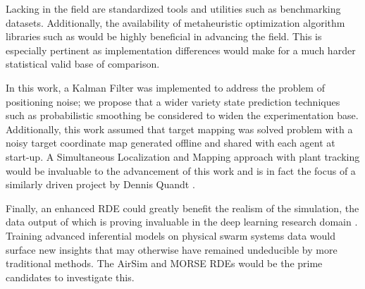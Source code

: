 \documentclass{report}
\begin{document}
Lacking in the field are standardized tools and utilities such as benchmarking datasets. Additionally, the availability of metaheuristic optimization algorithm libraries such as \cite{James2018} would be highly beneficial in advancing the field. This is especially pertinent as implementation differences would make for a much harder statistical valid base of comparison.

In this work, a Kalman Filter was implemented to address the problem of positioning noise; we propose that a wider variety state prediction techniques such as probabilistic smoothing be considered to widen the experimentation base. Additionally, this work assumed that target mapping was solved problem with a noisy target coordinate map generated offline and shared with each agent at start-up. A Simultaneous Localization and Mapping approach with plant tracking would be invaluable to the advancement of this work and is in fact the focus of a similarly driven project by Dennis Quandt \cite{}.

Finally, an enhanced RDE could greatly benefit the realism of the simulation, the data output of which is proving invaluable in the deep learning research domain \cite{Shah2018}. Training advanced inferential models on physical swarm systems data would surface new insights that may otherwise have remained undeducible by more traditional methods. The AirSim \cite{Shah2018} and MORSE \cite{Morse2011} RDEs would be the prime candidates to investigate this.




\newpage
\end{document}
